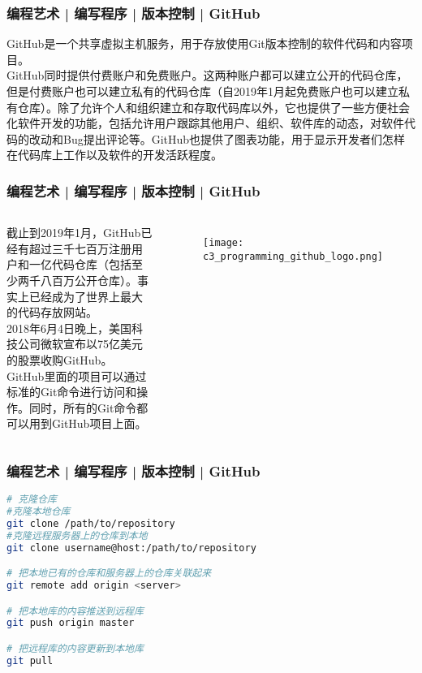 \begin{frame}
  \frametitle{编程艺术 | 编写程序 | 版本控制 | \alert{GitHub}}
  GitHub是一个共享虚拟主机服务，用于\alert{存放使用Git版本控制的软件代码和内容项目}。\\
  \vspace{1em}
GitHub同时提供付费账户和免费账户。这两种账户都可以建立公开的代码仓库，但是付费账户也可以建立私有的代码仓库（自2019年1月起免费账户也可以建立私有仓库）。除了允许个人和组织建立和存取代码库以外，它也提供了一些方便社会化软件开发的功能，包括允许用户跟踪其他用户、组织、软件库的动态，对软件代码的改动和Bug提出评论等。GitHub也提供了图表功能，用于显示开发者们怎样在代码库上工作以及软件的开发活跃程度。\\
\end{frame}

\begin{frame}
  \frametitle{编程艺术 | 编写程序 | 版本控制 | \alert{GitHub}}
  \begin{columns}
截止到2019年1月，GitHub已经有超过三千七百万注册用户和一亿代码仓库（包括至少两千八百万公开仓库）。事实上已经成为了\alert{世界上最大的代码存放网站}。\\
  \vspace{1em}
  2018年6月4日晚上，美国科技公司微软宣布以75亿美元的股票收购GitHub。\\
  \vspace{1em}
  GitHub里面的项目可以通过标准的Git命令进行访问和操作。同时，所有的Git命令都可以用到GitHub项目上面。
    \begin{figure}
      \centering
      \texttt{[image: c3\_programming\_github\_logo.png]}
    \end{figure}
\end{columns}
\end{frame}

\begin{frame}[fragile]
  \frametitle{编程艺术 | 编写程序 | 版本控制 | \alert{GitHub}}
  \vspace{-1.5em}
\begin{lstlisting}[language=sh]
# 克隆仓库
#克隆本地仓库
git clone /path/to/repository
#克隆远程服务器上的仓库到本地
git clone username@host:/path/to/repository

# 把本地已有的仓库和服务器上的仓库关联起来
git remote add origin <server>

# 把本地库的内容推送到远程库
git push origin master

# 把远程库的内容更新到本地库
git pull
\end{lstlisting}
\end{frame}

